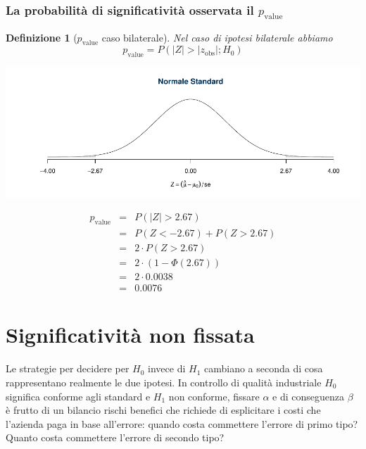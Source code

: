 \documentclass[
  11pt,
]{book}
\theoremstyle{mytheoremstyle}
\theoremstyle{mydefstyle}
\newtheorem{definition}{Definizione}[section]
\begin{document}
\subsubsection{\texorpdfstring{La probabilità di significatività osservata il \(p_\text{value}\)}{La probabilità di significatività osservata il p\_\textbackslash text\{value\}}}\label{la-probabilituxe0-di-significativituxe0-osservata-il-p_textvalue-2}

\begin{info}

\begin{definition}[$p_\text{value}$ caso bilaterale]
Nel caso di ipotesi bilaterale abbiamo
\[p_\text{value}=P(|Z|>|z_{\text{obs}}|;H_0)\]
\end{definition}

\end{info}

\begin{center}\includegraphics{Appunti_di_Statistica_2025_files/figure-latex/15-test-mu-pi-20-1} \end{center}

\begin{eqnarray*}
p_{\text{value}}&=& P(|Z|>2.67) \\
                &=& P(Z<-2.67)+P(Z>2.67)\\
                &=& 2\cdot P(Z>2.67)\\
                &=& 2\cdot (1-\Phi(2.67))\\
                &=& 2\cdot 0.0038\\
                &=&  0.0076
\end{eqnarray*}

\section{Significatività non fissata}\label{significativituxe0-non-fissata}

Le strategie per decidere per \(H_0\) invece di \(H_1\) cambiano a seconda di cosa
rappresentano realmente le due ipotesi. In controllo di qualità industriale
\(H_0\) significa conforme agli standard e \(H_1\) non conforme, fissare \(\alpha\) e
di conseguenza \(\beta\) è frutto di un bilancio rischi benefici che richiede di
esplicitare i costi che l'azienda paga in base all'errore: quando costa commettere
l'errore di primo tipo? Quanto costa commettere l'errore di secondo tipo?
\end{document}
